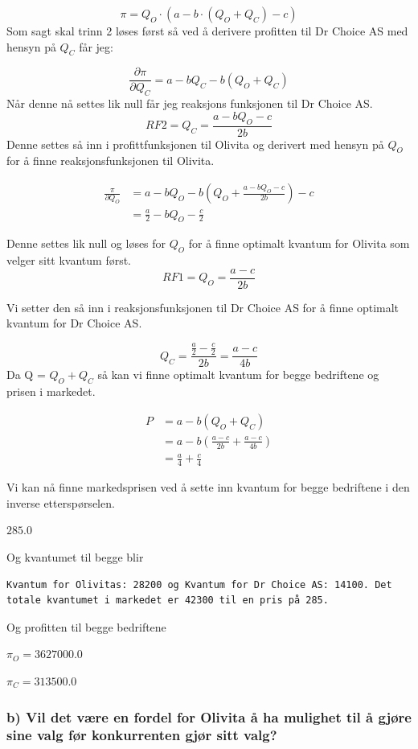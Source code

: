 \documentclass[
  12pt,
  a4paper,
  DIV=11,
  numbers=noendperiod]{scrartcl}
\begin{document}
\[
\pi = Q_O \cdot (a - b \cdot (Q_O + Q_C) - c) 
\] Som sagt skal trinn 2 løses først så ved å derivere profitten til Dr
Choice AS med hensyn på \(Q_C\) får jeg:

\[
\frac{\partial \pi}{\partial Q_C} = a- bQ_C - b(Q_O + Q_C) 
\] Når denne nå settes lik null får jeg reaksjons funksjonen til Dr
Choice AS. \[
RF2 = Q_C= \frac{a-bQ_O - c}{2b}
\] Denne settes så inn i profittfunksjonen til Olivita og derivert med
hensyn på \(Q_O\) for å finne reaksjonsfunksjonen til Olivita.

\begin{align*}
\frac{\pi}{\partial Q_O} &= a - bQ_O - b(Q_O + \frac{a-bQ_O - c}{2b}) - c \\
&= \frac{a}{2} - bQ_O - \frac{c}{2}
\end{align*}

Denne settes lik null og løses for \(Q_O\) for å finne optimalt kvantum
for Olivita som velger sitt kvantum først. \[
RF1 = Q_O = \frac{a-c}{2b}
\]

Vi setter den så inn i reaksjonsfunksjonen til Dr Choice AS for å finne
optimalt kvantum for Dr Choice AS.

\[
Q_C = \frac{\frac{a}{2}-\frac{c}{2}}{2b} = \frac{a-c}{4b}
\] Da Q = \(Q_O + Q_C\) så kan vi finne optimalt kvantum for begge
bedriftene og prisen i markedet.

\begin{align*}
P &= a - b(Q_O + Q_C) \\
&= a- b(\frac{a-c}{2b} + \frac{a- c}{4b}) \\
&= \frac{a}{4} + \frac{c}{4}
\end{align*}

Vi kan nå finne markedsprisen ved å sette inn kvantum for begge
bedriftene i den inverse etterspørselen.

$\displaystyle 285.0$

Og kvantumet til begge blir

\begin{verbatim}
Kvantum for Olivitas: 28200 og Kvantum for Dr Choice AS: 14100. Det totale kvantumet i markedet er 42300 til en pris på 285.
\end{verbatim}

Og profitten til begge bedriftene

$\displaystyle π_{O} = 3627000.0$

$\displaystyle π_{C} = 313500.0$

\newpage

\subsubsection{b) Vil det være en fordel for Olivita å ha mulighet til å
gjøre sine valg før konkurrenten gjør sitt
valg?}\label{b-vil-det-vuxe6re-en-fordel-for-olivita-uxe5-ha-mulighet-til-uxe5-gjuxf8re-sine-valg-fuxf8r-konkurrenten-gjuxf8r-sitt-valg}
\end{document}
